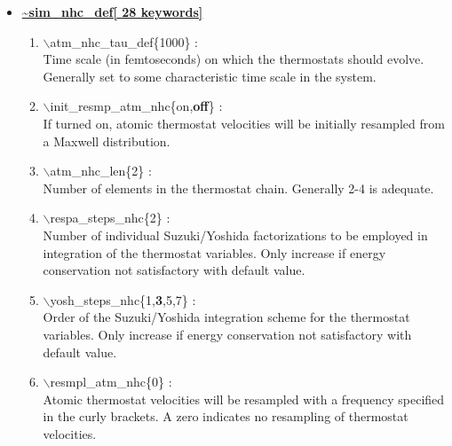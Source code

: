 \begin{itemize}
\begin{enumerate}
\end{enumerate}

\clearpage
\huge
\item[] \underline{\bf \~{}sim\_nhc\_def[ 28 keywords]}
\begin{enumerate}
 \vspace{0.15in} \Large
 \item   $\backslash$atm\_nhc\_tau\_def\{1000\} : \\
 \large
  Time scale (in femtoseconds) on which the thermostats should evolve. 
  Generally set to some characteristic time scale in the system.

 \vspace{0.15in} \Large
 \item   $\backslash$init\_resmp\_atm\_nhc\{on,{\bf off}\} : \\
  \large
   If turned on, atomic thermostat velocities will be initially resampled from
   a Maxwell distribution.

 \vspace{0.15in} \Large
 \item   $\backslash$atm\_nhc\_len\{2\} : \\
  \large
   Number of elements in the thermostat chain.  Generally 2-4 is adequate.

 \vspace{0.15in}\Large
 \item   $\backslash$respa\_steps\_nhc\{2\} : \\
   \large
     Number of individual Suzuki/Yoshida factorizations to be employed in
     integration of the thermostat variables.  Only
     increase if energy conservation not satisfactory with default value.

 \vspace{0.15in}\Large
 \item   $\backslash$yosh\_steps\_nhc\{1,{\bf 3},5,7\} : \\
  \large
   Order of the Suzuki/Yoshida integration scheme for the thermostat
   variables.  Only increase if energy conservation not satisfactory with
   default value.

 \vspace{0.15in} \Large
 \item   $\backslash$resmpl\_atm\_nhc\{0\} : \\
  \large
   Atomic thermostat velocities will be resampled with a frequency specified
   in the curly brackets.  A zero indicates no resampling of thermostat
   velocities.


\end{enumerate}
\end{itemize}
